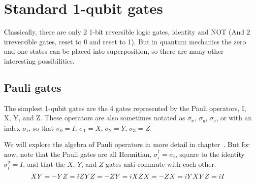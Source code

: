 



\clearpage
\section{Standard 1-qubit gates}


Classically, there are only 2 1-bit reversible logic gates, identity and NOT (And 2 irreversible gates, reset to 0 and reset to 1). But in quantum mechanics the zero and one states can be placed into superposition, so there are many other interesting possibilities. 

\subsection{Pauli gates}
The simplest 1-qubit gates are the 4 gates represented by the Pauli operators, I, X, Y, and Z. These operators are also sometimes notated as $\sigma_x$, $\sigma_y$, $\sigma_z$, or with an index $\sigma_i$, so that $\sigma_0=I$, $\sigma_1=X$, $\sigma_2=Y$, $\sigma_3=Z$. %

We will explore the algebra of Pauli operators in more detail in chapter~. But for now, note that the Pauli gates are all Hermitian, $\sigma_i^\dagger=\sigma_i$, square to the identity $\sigma_i^2 =I$, and that the $X$, $Y$, and $Z$ gates anti-commute with each other.
\[
XY = -YZ = iZ \notag \\
YZ = -ZY = iX \notag \\
ZX = -ZX = iY \notag \\
XYZ = iI \notag
\]


